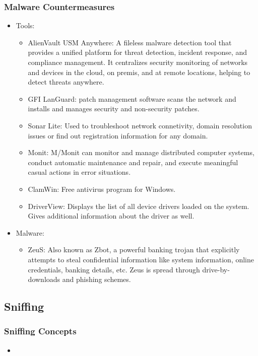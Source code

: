 \subsubsection{Malware Countermeasures}
\begin{itemize}
    \item Tools:
    \begin{itemize}
        \item AlienVault USM Anywhere: A fileless malware detection tool that provides a unified platform for threat detection, incident response, and compliance management. It centralizes security monitoring of networks and devices in the cloud, on premis, and at remote locations, helping to detect threats anywhere.
        \item GFI LanGuard: patch management software scans the network and installs and manages security and non-security patches.
        \item Sonar Lite: Used to troubleshoot network connetivity, domain resolution issues or find out registration information for any domain.
        \item Monit: M/Monit can monitor and manage distributed computer systems, conduct automatic maintenance and repair, and execute meaningful casual actions in error situations.
        \item ClamWin: Free antivirus program for Windows.
        \item DriverView: Displays the list of all device drivers loaded on the system. Gives additional information about the driver as well.
    \end{itemize}
    \item Malware:
    \begin{itemize}
        \item ZeuS: Also known as Zbot, a powerful banking trojan that explicitly attempts to steal confidential information like system information, online credentials, banking details, etc. Zeus is spread through drive-by-downloads and phishing schemes.
    \end{itemize}
\end{itemize}

\subsection{Sniffing}
\subsubsection{Sniffing Concepts}
\begin{itemize}
    \item 
\end{itemize}
